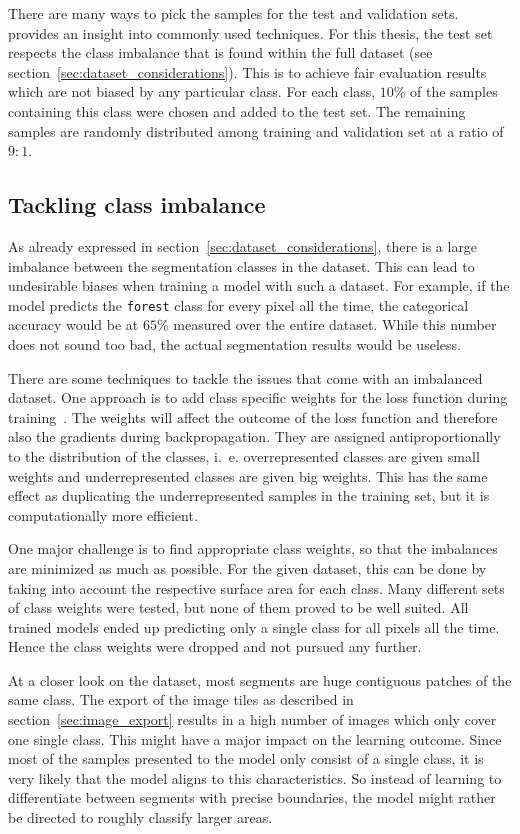 There are many ways to pick the samples for the test and validation sets. \cite{val_split18} provides an insight into commonly used techniques. For this thesis, the test set respects the class imbalance that is found within the full dataset (see section~\ref{sec:dataset_considerations}). This is to achieve fair evaluation results which are not biased by any particular class. For each class, $10\%$ of the samples containing this class were chosen and added to the test set. The remaining samples are randomly distributed among training and validation set at a ratio of $9:1$.

\subsection{Tackling class imbalance}
\label{sec:class_imbalance}

As already expressed in section~\ref{sec:dataset_considerations}, there is a large imbalance between the segmentation classes in the dataset. This can lead to undesirable biases when training a model with such a dataset. For example, if the model predicts the \texttt{forest} class for every pixel all the time, the categorical accuracy would be at $65\%$ measured over the entire dataset. While this number does not sound too bad, the actual segmentation results would be useless.

There are some techniques to tackle the issues that come with an imbalanced dataset. One approach is to add class specific weights for the loss function during training~\cite{class_imbalance19}. The weights will affect the outcome of the loss function and therefore also the gradients during backpropagation. They are assigned antiproportionally to the distribution of the classes, i.~e. overrepresented classes are given small weights and underrepresented classes are given big weights. This has the same effect as duplicating the underrepresented samples in the training set, but it is computationally more efficient.

One major challenge is to find appropriate class weights, so that the imbalances are minimized as much as possible. For the given dataset, this can be done by taking into account the respective surface area for each class. Many different sets of class weights were tested, but none of them proved to be well suited. All trained models ended up predicting only a single class for all pixels all the time. Hence the class weights were dropped and not pursued any further.

At a closer look on the dataset, most segments are huge contiguous patches of the same class. The export of the image tiles as described in section~\ref{sec:image_export} results in a high number of images which only cover one single class. This might have a major impact on the learning outcome. Since most of the samples presented to the model only consist of a single class, it is very likely that the model aligns to this characteristics. So instead of learning to differentiate between segments with precise boundaries, the model might rather be directed to roughly classify larger areas.


